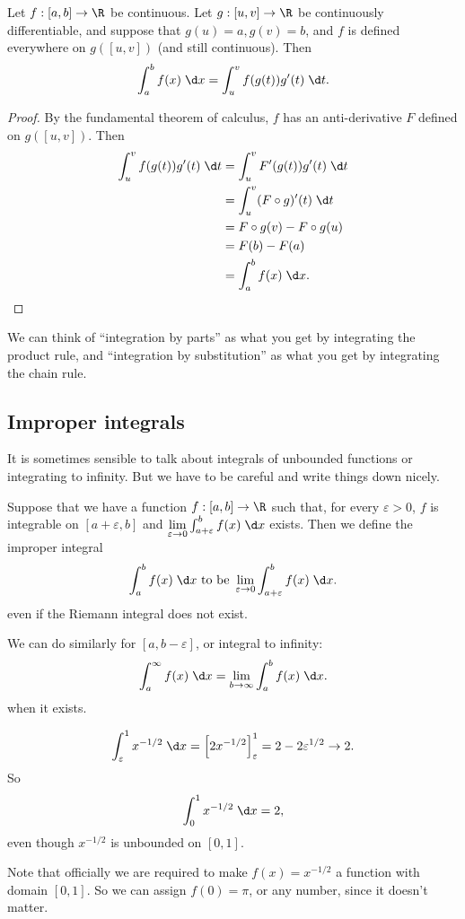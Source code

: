 \documentclass[a4paper]{article}
\begin{document}
\begin{thm}
  Let $f: [a, b] \to \R$ be continuous. Let $g: [u, v] \to \R$ be continuously differentiable, and suppose that $g(u) = a, g(v) = b$, and $f$ is defined everywhere on $g([u, v])$ (and still continuous). Then
  \[
    \int_a^b f(x)\;\d x = \int_u^v f(g(t))g'(t)\;\d t.
  \]
\end{thm}

\begin{proof}
  By the fundamental theorem of calculus, $f$ has an anti-derivative $F$ defined on $g([u, v])$. Then
  \begin{align*}
    \int_u^v f(g(t))g'(t) \;\d t &= \int_u^v F'(g(t))g'(t)\;\d t \\
    &= \int_u^v (F\circ g)'(t)\;\d t \\
    &= F\circ g(v) - F\circ g(u)\\
    &= F(b) - F(a)\\
    &= \int_a^b f(x)\;\d x.
  \end{align*}
\end{proof}
We can think of ``integration by parts'' as what you get by integrating the product rule, and ``integration by substitution'' as what you get by integrating the chain rule.

\subsection{Improper integrals}
It is sometimes sensible to talk about integrals of unbounded functions or integrating to infinity. But we have to be careful and write things down nicely.

\begin{defi}
  Suppose that we have a function $f: [a, b] \to \R$ such that, for every $\varepsilon > 0$, $f$ is integrable on $[a + \varepsilon, b]$ and $\lim\limits_{\varepsilon \to 0}\int_{a + \varepsilon}^b f(x)\;\d x$ exists. Then we define the improper integral
  \[
    \int_a^bf(x)\;\d x \text{ to be } \lim_{\varepsilon \to 0}\int_{a + \varepsilon}^b f(x)\;\d x.
  \]
  even if the Riemann integral does not exist.

  We can do similarly for $[a, b - \varepsilon]$, or integral to infinity:
  \[
    \int_a^\infty f(x)\;\d x = \lim_{b \to \infty} \int_a^b f(x)\;\d x.
  \]
  when it exists.
\end{defi}
\begin{eg}
  \[
    \int_\varepsilon^1 x^{-1/2}\;\d x = \left[2x^{-1/2}\right]^1_\varepsilon = 2 - 2\varepsilon^{1/2} \to 2.
  \]
  So
  \[
    \int_0^1 x^{-1/2}\;\d x = 2,
  \]
  even though $x^{-1/2}$ is unbounded on $[0, 1]$.

  Note that officially we are required to make $f(x) = x^{-1/2}$ a function with domain $[0, 1]$. So we can assign $f(0) = \pi$, or any number, since it doesn't matter.
\end{eg}
\end{document}
